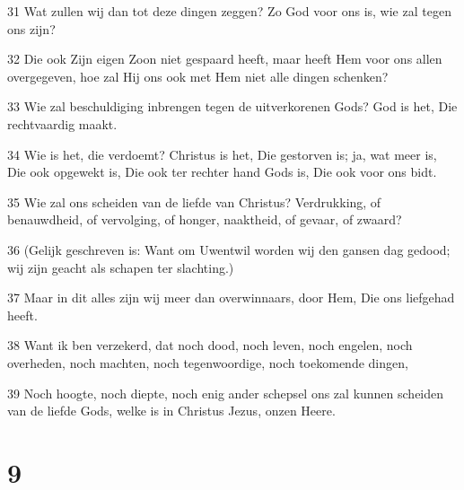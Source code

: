 \par 31 Wat zullen wij dan tot deze dingen zeggen? Zo God voor ons is, wie zal tegen ons zijn?
\par 32 Die ook Zijn eigen Zoon niet gespaard heeft, maar heeft Hem voor ons allen overgegeven, hoe zal Hij ons ook met Hem niet alle dingen schenken?
\par 33 Wie zal beschuldiging inbrengen tegen de uitverkorenen Gods? God is het, Die rechtvaardig maakt.
\par 34 Wie is het, die verdoemt? Christus is het, Die gestorven is; ja, wat meer is, Die ook opgewekt is, Die ook ter rechter hand Gods is, Die ook voor ons bidt.
\par 35 Wie zal ons scheiden van de liefde van Christus? Verdrukking, of benauwdheid, of vervolging, of honger, naaktheid, of gevaar, of zwaard?
\par 36 (Gelijk geschreven is: Want om Uwentwil worden wij den gansen dag gedood; wij zijn geacht als schapen ter slachting.)
\par 37 Maar in dit alles zijn wij meer dan overwinnaars, door Hem, Die ons liefgehad heeft.
\par 38 Want ik ben verzekerd, dat noch dood, noch leven, noch engelen, noch overheden, noch machten, noch tegenwoordige, noch toekomende dingen,
\par 39 Noch hoogte, noch diepte, noch enig ander schepsel ons zal kunnen scheiden van de liefde Gods, welke is in Christus Jezus, onzen Heere.

\chapter{9}

